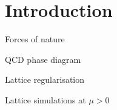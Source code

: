\section{Introduction}

\begin{frame}{Forces of nature}

\end{frame}

\begin{frame}{QCD phase diagram}
  
\end{frame}

\begin{frame}{Lattice regularisation}

\end{frame}

\begin{frame}{Lattice simulations at \texorpdfstring{$\mu > 0$}{m > 0}}
  
\end{frame}
